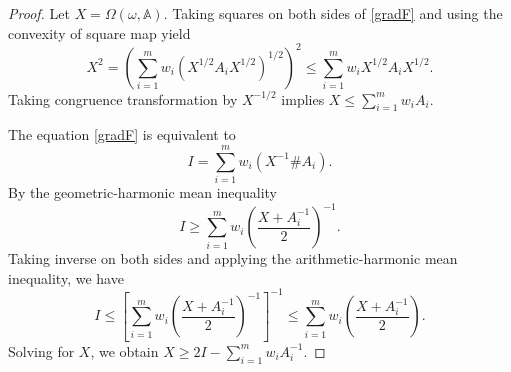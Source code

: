 \documentclass[12pt,reqno]{amsart}
\newtheorem{theorem}{Theorem}[section]
\DeclareMathOperator{\tr}{\mathrm{tr}}
\begin{document}
\begin{proof}
Let $X = \Omega (\omega, \mathbb{A})$. Taking squares on both sides of \eqref{gradF} and using the convexity of square map yield
\begin{displaymath}
X^{2} = \left( \sum_{i=1}^{m} w_{i} (X^{1/2} A_{i} X^{1/2})^{1/2} \right)^{2} \leq \sum_{i=1}^{m} w_{i} X^{1/2} A_{i} X^{1/2}.
\end{displaymath}
Taking congruence transformation by $X^{-1/2}$ implies $\displaystyle X \leq \sum_{i=1}^{m} w_{i} A_{i}$.

The equation \eqref{gradF} is equivalent to
\begin{equation} \label{grad-Wass}
I = \sum_{i=1}^{m} w_{i} (X^{-1} \# A_{i}).
\end{equation}
By the geometric-harmonic mean inequality
\begin{displaymath}
I \geq \sum_{i=1}^{m} w_{i} \left( \frac{X + A_{i}^{-1}}{2} \right)^{-1}.
\end{displaymath}
Taking inverse on both sides and applying the arithmetic-harmonic mean inequality, we have
\begin{displaymath}
I \leq \left[ \sum_{i=1}^{m} w_{i} \left( \frac{X + A_{i}^{-1}}{2} \right)^{-1} \right]^{-1} \leq \sum_{i=1}^{m} w_{i} \left( \frac{X + A_{i}^{-1}}{2} \right).
\end{displaymath}
Solving for $X$, we obtain $\displaystyle X \geq 2I - \sum_{i=1}^{m} w_{i} A_{i}^{-1}$.
\end{proof}


\end{document}

